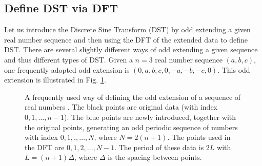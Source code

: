 \documentclass{article}
\begin{document}
\subsection{Define DST via DFT}

Let us introduce the Discrete Sine Transform (DST) by odd extending a given
real number sequence and then using the DFT of the extended data to define
DST. There are several slightly different ways of odd extending a given
sequence and thus different types of DST. Given a $n = 3$ real number sequence
$(a, b, c)$, one frequently adopted odd extension is $(0, a, b, c, 0, - a, -
b, - c, 0)$. This odd extension is illustrated in Fig. \ref{18-1-11-e1}.

\begin{figure}[h]
  \caption{\label{18-1-11-e1}A frequently used way of defining the odd
  extension of a sequence of real numbers . The black points are original data
  (with index $0, 1, \ldots, n - 1$). The blue points are newly introduced,
  together with the original points, generating an odd periodic sequence of
  numbers with index $0, 1, ., \ldots, N$, where $N = 2 (n + 1)$. The points
  used in the DFT are $0, 1, 2, \ldots, N - 1$. The period of these data is $2
  L$ with $L = (n + 1) \Delta$, where $\Delta$ is the spacing between points.}
\end{figure}
\end{document}
